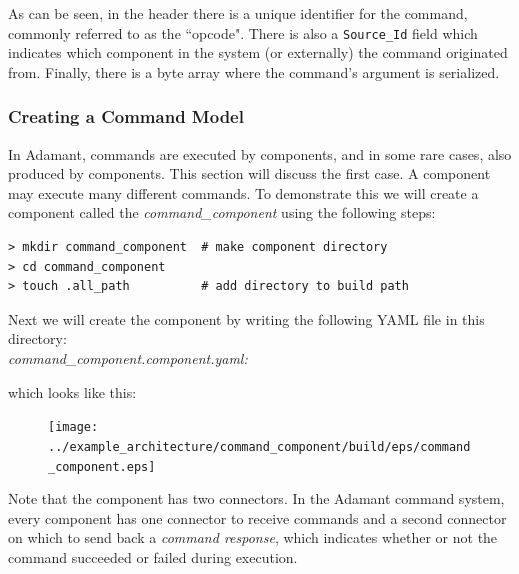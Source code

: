 


As can be seen, in the header there is a unique identifier for the command, commonly referred to as the ``opcode". There is also a \texttt{Source\_Id} field which indicates which component in the system (or externally) the command originated from. Finally, there is a byte array where the command's argument is serialized. \\

\subsubsection{Creating a Command Model}

In Adamant, commands are executed by components, and in some rare cases, also produced by components. This section will discuss the first case. A component may execute many different commands. To demonstrate this we will create a component called the \textit{command\_component} using the following steps:

\vspace{5mm} %
\begin{verbatim}
> mkdir command_component  # make component directory
> cd command_component 
> touch .all_path          # add directory to build path
\end{verbatim}
\vspace{5mm} %

Next we will create the component by writing the following YAML file in this directory: \\

\textit{command\_component.component.yaml:}

which looks like this:

\begin{figure}[H]
  \texttt{[image: ../example\_architecture/command\_component/build/eps/command\_component.eps]}
\end{figure}

Note that the component has two connectors. In the Adamant command system, every component has one connector to receive commands and a second connector on which to send back a \textit{command response}, which indicates whether or not the command succeeded or failed during execution. \\

